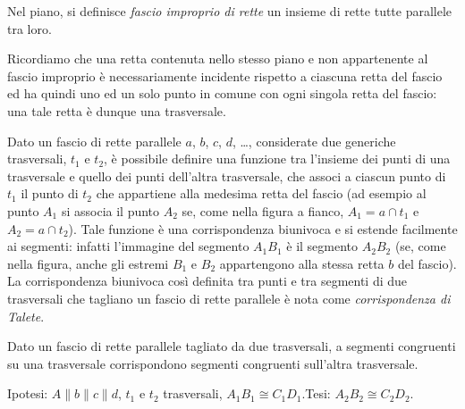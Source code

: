 \begin{definizione}
Nel piano, si definisce \emph{fascio improprio di rette} un insieme 
di rette tutte parallele tra loro.
\end{definizione}

Ricordiamo che una retta contenuta nello stesso piano e non 
appartenente al fascio improprio è necessariamente incidente rispetto 
a ciascuna retta del fascio ed ha quindi uno ed un solo punto in 
comune con ogni singola retta del fascio: una tale retta è dunque una 
trasversale.

\noindent\begin{minipage}{0.65\textwidth}\parindent15pt
Dato un fascio di rette parallele \(a\), \(b\), \(c\), \(d\), \ldots{}, 
considerate due generiche trasversali, \(t_1\) e \(t_2\), è possibile 
definire una funzione tra l'insieme dei punti di una trasversale e 
quello dei punti dell'altra trasversale, che associ a ciascun punto 
di \(t_1\) il punto di \(t_2\) che appartiene alla medesima retta del 
fascio (ad esempio al punto \(A_1\) si associa il punto \(A_2\) se, come 
nella figura a fianco, \(A_1 = a \cap t_1\) e \(A_2 = a \cap t_2\)). Tale 
funzione è una corrispondenza biunivoca e si estende facilmente ai 
segmenti: infatti l'immagine del segmento \(A_1B_1\) è il segmento 
\(A_2B_2\) (se, come nella figura, anche gli estremi \(B_1\) e \(B_2\) 
appartengono alla stessa retta \(b\) del fascio).
La corrispondenza biunivoca così definita tra punti e tra segmenti di 
due trasversali che tagliano un fascio di rette parallele è nota come 
\emph{corrispondenza di Talete}.
\end{minipage}\hfil
\begin{minipage}{0.35\textwidth}
	\centering
\end{minipage}

\begin{teorema}
Dato un fascio di rette parallele tagliato da due trasversali, a 
segmenti congruenti su una trasversale corrispondono segmenti 
congruenti sull'altra trasversale.
\end{teorema}

\noindent Ipotesi: \(A\parallel b\parallel c\parallel d\), \(t_1\) e 
\(t_2\) trasversali, \(A_1B_1\cong C_1D_1\).\tab Tesi: \(A_2B_2\cong 
C_2D_2\).


\begin{inaccessibleblock}
 \begin{figure}[htb]
	\centering
\end{figure}
\end{inaccessibleblock}

